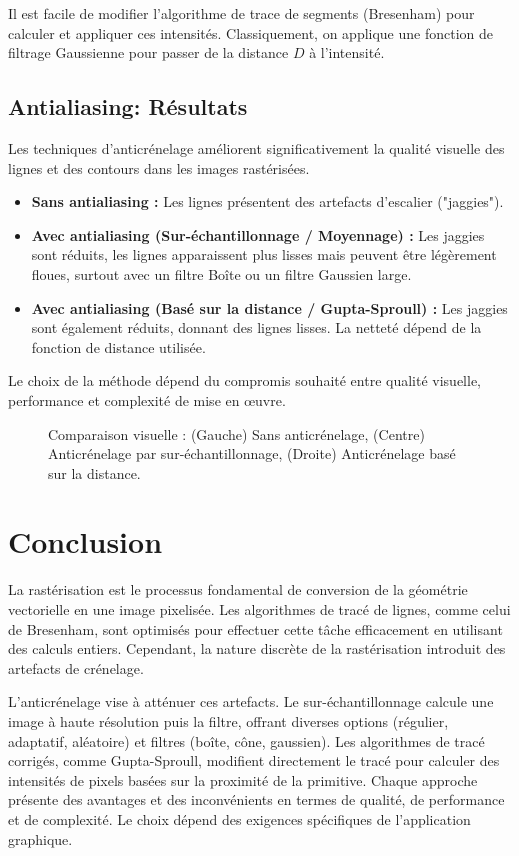 \documentclass{article}
\begin{document}
Il est facile de modifier l'algorithme de trace de segments (Bresenham) pour calculer et appliquer ces intensités. Classiquement, on applique une fonction de filtrage Gaussienne pour passer de la distance $D$ à l'intensité.

\subsection{Antialiasing: Résultats}
Les techniques d'anticrénelage améliorent significativement la qualité visuelle des lignes et des contours dans les images rastérisées.
\begin{itemize}
    \item \textbf{Sans antialiasing :} Les lignes présentent des artefacts d'escalier ("jaggies").
    \item \textbf{Avec antialiasing (Sur-échantillonnage / Moyennage) :} Les jaggies sont réduits, les lignes apparaissent plus lisses mais peuvent être légèrement floues, surtout avec un filtre Boîte ou un filtre Gaussien large.
    \item \textbf{Avec antialiasing (Basé sur la distance / Gupta-Sproull) :} Les jaggies sont également réduits, donnant des lignes lisses. La netteté dépend de la fonction de distance utilisée.
\end{itemize}
Le choix de la méthode dépend du compromis souhaité entre qualité visuelle, performance et complexité de mise en œuvre.

\begin{figure}[H]
\centering
\caption{Comparaison visuelle : (Gauche) Sans anticrénelage, (Centre) Anticrénelage par sur-échantillonnage, (Droite) Anticrénelage basé sur la distance.}
\label{fig:antialiasing_results}
\end{figure}

\section{Conclusion}
La rastérisation est le processus fondamental de conversion de la géométrie vectorielle en une image pixelisée. Les algorithmes de tracé de lignes, comme celui de Bresenham, sont optimisés pour effectuer cette tâche efficacement en utilisant des calculs entiers. Cependant, la nature discrète de la rastérisation introduit des artefacts de crénelage.

L'anticrénelage vise à atténuer ces artefacts. Le sur-échantillonnage calcule une image à haute résolution puis la filtre, offrant diverses options (régulier, adaptatif, aléatoire) et filtres (boîte, cône, gaussien). Les algorithmes de tracé corrigés, comme Gupta-Sproull, modifient directement le tracé pour calculer des intensités de pixels basées sur la proximité de la primitive. Chaque approche présente des avantages et des inconvénients en termes de qualité, de performance et de complexité. Le choix dépend des exigences spécifiques de l'application graphique.
\end{document}
